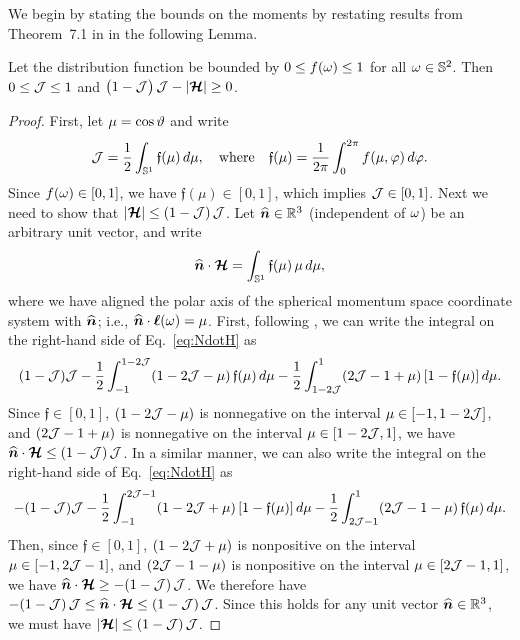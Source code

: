We begin by stating the bounds on the moments by restating results from Theorem~7.1 in \cite{banachLarecki_2017} in the following Lemma.  
\begin{lemma}
  Let the distribution function be bounded by $0\le f(\omega) \le1$ for all $\omega\in\mathbb{S}^{2}$.  
  Then $0\le\mathcal{J}\le1$ and $\big(1-\mathcal{J}\big)\,\mathcal{J}-|\boldsymbol{\mathcal{H}}|\ge0$. 
  \label{lem: MomentRealizable} 
\end{lemma}
\begin{proof}
  First, let $\mu=\cos\vartheta$ and write
  \begin{equation}
    \mathcal{J}=\frac{1}{2}\int_{\mathbb{S}^{1}}\mathfrak{f}(\mu)\,d\mu,
    \quad\text{where}\quad
    \mathfrak{f}(\mu)=\frac{1}{2\pi}\int_{0}^{2\pi}f(\mu,\varphi)\,d\varphi.  
  \end{equation}  
  Since $f(\omega)\in[0,1]$, we have $\mathfrak{f}(\mu)\in[0,1]$, which implies $\mathcal{J}\in[0,1]$.  
  Next we need to show that $|\boldsymbol{\mathcal{H}}|\le(1-\mathcal{J})\,\mathcal{J}$.  
  Let $\widehat{\boldsymbol{n}}\in\mathbb{R}^{3}$ (independent of $\omega$) be an arbitrary unit vector, and write
  \begin{equation}
    \widehat{\boldsymbol{n}}\cdot\boldsymbol{\mathcal{H}}
    =\int_{\mathbb{S}^{1}}\mathfrak{f}(\mu)\,\mu\,d\mu,
    \label{eq:NdotH}
  \end{equation}
  where we have aligned the polar axis of the spherical momentum space coordinate system with $\widehat{\boldsymbol{n}}$; i.e., $\widehat{\boldsymbol{n}}\cdot\boldsymbol{\ell}(\omega)=\mu$.  
  First, following \cite{banachLarecki_2017}, we can write the integral on the right-hand side of Eq.~\eqref{eq:NdotH} as
  \begin{equation*}
    (1-\mathcal{J})\mathcal{J} - \frac{1}{2}\int_{-1}^{1-2\mathcal{J}}(1-2\mathcal{J}-\mu)\,\mathfrak{f}(\mu)\,d\mu
    -\frac{1}{2}\int_{1-2\mathcal{J}}^{1}(2\mathcal{J}-1+\mu)\,[1-\mathfrak{f}(\mu)]\,d\mu.  
  \end{equation*}
  Since $\mathfrak{f}\in[0,1]$, $(1-2\mathcal{J}-\mu)$ is nonnegative on the interval $\mu\in[-1,1-2\mathcal{J}]$, and $(2\mathcal{J}-1+\mu)$ is nonnegative on the interval $\mu\in[1-2\mathcal{J},1]$, we have $\widehat{\boldsymbol{n}}\cdot\boldsymbol{\mathcal{H}}\le(1-\mathcal{J})\,\mathcal{J}$.  
  In a similar manner, we can also write the integral on the right-hand side of Eq.~\eqref{eq:NdotH} as
  \begin{equation*}
    -(1-\mathcal{J})\mathcal{J}-\frac{1}{2}\int_{-1}^{2\mathcal{J}-1}(1-2\mathcal{J}+\mu)\,[1-\mathfrak{f}(\mu)]\,d\mu
    -\frac{1}{2}\int_{2\mathcal{J}-1}^{1}(2\mathcal{J}-1-\mu)\,\mathfrak{f}(\mu)\,d\mu.  
  \end{equation*}
  Then, since $\mathfrak{f}\in[0,1]$, $(1-2\mathcal{J}+\mu)$ is nonpositive on the interval $\mu\in[-1,2\mathcal{J}-1]$, and $(2\mathcal{J}-1-\mu)$ is nonpositive on the interval $\mu\in[2\mathcal{J}-1,1]$, we have $\widehat{\boldsymbol{n}}\cdot\boldsymbol{\mathcal{H}}\ge-(1-\mathcal{J})\,\mathcal{J}$.  
  We therefore have $-(1-\mathcal{J})\,\mathcal{J}\le\widehat{\boldsymbol{n}}\cdot\boldsymbol{\mathcal{H}}\le(1-\mathcal{J})\,\mathcal{J}$.  
  Since this holds for any unit vector $\widehat{\boldsymbol{n}}\in\mathbb{R}^{3}$, we must have $|\boldsymbol{\mathcal{H}}|\le(1-\mathcal{J})\,\mathcal{J}$.  
\end{proof}


